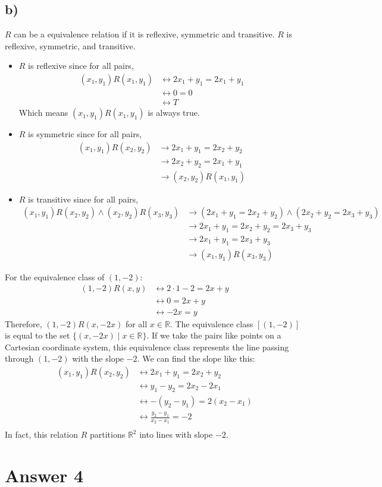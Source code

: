 \documentclass[12pt]{article}
\begin{document}
\subsection*{b) }
$R$ can be a equivalence relation if it is reflexive, symmetric and transitive.
$R$ is reflexive, symmetric, and transitive.
\begin{itemize}
\item $R$ is reflexive since for all pairs,
    \begin{align*}
    (x_1, y_1)R(x_1, y_1) &\leftrightarrow 2x_1 + y_1 = 2x_1 + y_1 \\
    &\leftrightarrow 0 = 0 \\
    &\leftrightarrow T
    \end{align*}
    Which means $(x_1, y_1)R(x_1, y_1)$ is always true.
\item $R$ is symmetric since for all pairs,
    \begin{align*}
    (x_1, y_1)R(x_2, y_2) &\to 2x_1 + y_1 = 2x_2 + y_2 \\
    &\to 2x_2 + y_2 = 2x_1 + y_1 \\
    &\to (x_2, y_2)R(x_1, y_1)
    \end{align*}
\item $R$ is transitive since for all pairs,
    \begin{align*}
    (x_1, y_1)R(x_2, y_2) \land (x_2, y_2)R(x_3, y_3) &\to (2x_1 + y_1 = 2x_2 + y_2) \land (2x_2 + y_2 = 2x_3 + y_3) \\
    &\to 2x_1 + y_1 = 2x_2 + y_2 = 2x_3 + y_3 \\
    &\to 2x_1 + y_1 = 2x_3 + y_3 \\
    &\to (x_1, y_1)R(x_3, y_3)
    \end{align*}
\end{itemize}
For the equivalence class of $(1, -2)$:
\begin{align*}
(1, -2)R(x, y) &\leftrightarrow 2 \cdot 1 - 2 = 2x + y \\
&\leftrightarrow 0 = 2x + y \\
&\leftrightarrow -2x = y
\end{align*}
Therefore, $(1, -2)R(x, -2x)$ for all $x \in \mathbb{R}$.
The equivalence class $[(1, -2)]$ is equal to the set $\{(x, -2x) \mid x \in \mathbb{R}\}$.
If we take the pairs like points on a Cartesian coordinate system, this equivalence class represents the line passing through $(1, -2)$ with the slope $-2$. We can find the slope like this:
\begin{align*}
(x_1, y_1)R(x_2, y_2) &\leftrightarrow 2x_1 + y_1 = 2x_2 + y_2 \\
&\leftrightarrow y_1 - y_2 = 2x_2 - 2x_1 \\
&\leftrightarrow -(y_2 - y_1) = 2(x_2 - x_1) \\
&\leftrightarrow \frac{y_2 - y_1}{x_2 - x_1} = -2 \\
\end{align*}
In fact, this relation $R$ partitions $\mathbb{R}^2$ into lines with slope $-2$.

\section*{Answer 4}
\end{document}
